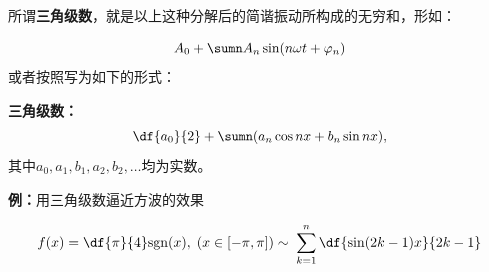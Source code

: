 所谓{\bf 三角级数}，就是以上这种分解后的简谐振动所构成的无穷和，形如：

$$A_0+\sumn A_n\sin(n\omega t+\varphi_n)$$
或者按照写为如下的形式：
\begin{thx}
	{\bf 三角级数：}
	$${\df{a_0}{2}+\sumn(a_n\cos nx+b_n\sin nx)},$$
	其中$a_0,a_1,b_1,a_2,b_2,\ldots$均为实数。
\end{thx}

{\bf 例：}用三角级数逼近方波的效果

$${f(x)=\df{\pi}{4}\mathrm{sgn}(x),\;(x\in[-\pi,\pi])
\;{\sim\;\sum\limits_{k=1}^n\df{\sin(2k-1)x}{2k-1}}}$$

\begin{center}
	\quad
	

\end{center}
